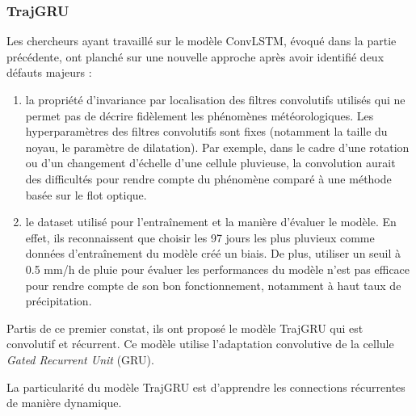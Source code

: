 \documentclass[12pt,a4paper,french]{article}
\newcommand\subsecspacing{1cm}
\begin{document}
\vspace{\subsecspacing}

\subsubsection{TrajGRU}

Les chercheurs ayant travaillé sur le modèle ConvLSTM, évoqué dans la partie précédente, ont planché sur une nouvelle approche après avoir identifié deux défauts majeurs : 

\begin{enumerate}
    \item la propriété d'invariance par localisation des filtres convolutifs utilisés qui ne permet pas de décrire fidèlement les phénomènes météorologiques. Les hyperparamètres des filtres convolutifs sont fixes (notamment la taille du noyau, le paramètre de dilatation). Par exemple, dans le cadre d'une rotation ou d'un changement d'échelle d'une cellule pluvieuse, la convolution aurait des difficultés pour rendre compte du phénomène comparé à une méthode basée sur le flot optique.
    \item le dataset utilisé pour l'entraînement et la manière d'évaluer le modèle. En effet, ils reconnaissent que choisir les 97 jours les plus pluvieux comme données d'entraînement du modèle créé un biais. De plus, utiliser un seuil à 0.5 mm/h de pluie pour évaluer les performances du modèle n'est pas efficace pour rendre compte de son bon fonctionnement, notamment à haut taux de précipitation. 
\end{enumerate}

Partis de ce premier constat, ils ont proposé le modèle TrajGRU qui est convolutif et récurrent. Ce modèle utilise l'adaptation convolutive de la cellule \textit{Gated Recurrent Unit} (GRU). 

La particularité du modèle TrajGRU est d'apprendre les connections récurrentes de manière dynamique. 
\end{document}
